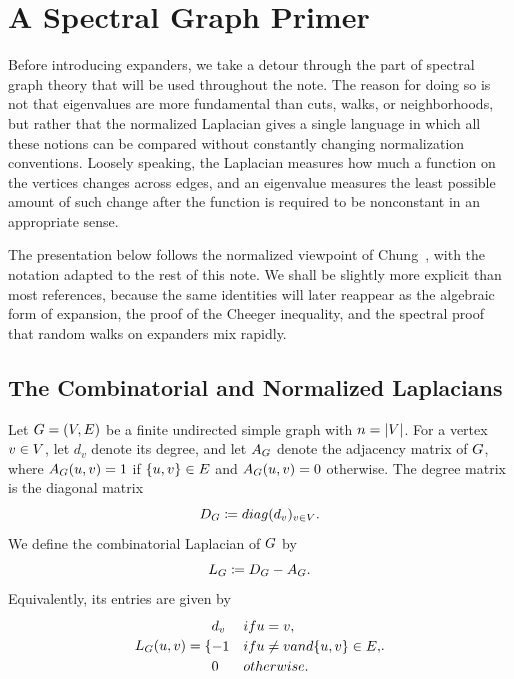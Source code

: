 \section{A Spectral Graph Primer}
\label{sec:spectral-graph-primer}

Before introducing expanders, we take a detour through the part of spectral graph theory that will be used throughout the note. The reason for doing so is not that eigenvalues are more fundamental than cuts, walks, or neighborhoods, but rather that the normalized Laplacian gives a single language in which all these notions can be compared without constantly changing normalization conventions. Loosely speaking, the Laplacian measures how much a function on the vertices changes across edges, and an eigenvalue measures the least possible amount of such change after the function is required to be nonconstant in an appropriate sense.

The presentation below follows the normalized viewpoint of Chung~\cite{Chu1997}, with the notation adapted to the rest of this note. We shall be slightly more explicit than most references, because the same identities will later reappear as the algebraic form of expansion, the proof of the Cheeger inequality, and the spectral proof that random walks on expanders mix rapidly.

\subsection{The Combinatorial and Normalized Laplacians}
\label{subsec:laplacian-definitions}

Let \(G=(V,E)\) be a finite undirected simple graph with \(n=\lvert V\rvert\). For a vertex \(v\in V\), let \(d_v\) denote its degree, and let \(A_{G}\) denote the adjacency matrix of \(G\), where \(A_{G}(u,v)=1\) if \(\{u,v\}\in E\) and \(A_{G}(u,v)=0\) otherwise. The degree matrix is the diagonal matrix
\begin{equation}
	D_{G}\coloneqq diag(d_v)_{v\in V}.
\end{equation}
We define the combinatorial Laplacian of \(G\) by
\begin{equation}
	L_{G}\coloneqq D_{G}-A_{G}.
\end{equation}
Equivalently, its entries are given by
\begin{equation}
	\CombLaplacian{\Graph}(u,v)=
	\begin{cases}
		d_v & \text{if }u=v,                                 \\
		-1  & \text{if }u\neq v\text{ and }\{u,v\}\in\Edges, \\
		0   & \text{otherwise.}
	\end{cases}
\end{equation}

